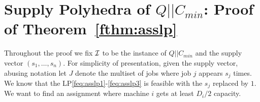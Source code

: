 \section{Supply Polyhedra of $Q||C_{min}$: Proof of Theorem~\ref{fthm:asslp}}\label{fsec:asslp}
\def\pv{\mathbf{b}}
\newcommand{\dem}{\mathsf{cap}}
  Throughout the proof we fix ${\cal I}$ to be the instance of $Q||C_{min}$ %
  and the supply vector $(s_1,\ldots,s_n)$. For simplicity of presentation, given the supply vector, abusing notation let $J$ denote the multiset of jobs where job $j$ appears $s_j$ times. We know that the LP\eqref{feq:asslp1}-\eqref{feq:asslp3} is feasible with the $s_j$ replaced by $1$. %
  We want to find an assignment where machine $i$ gets at least $D_i/2$ capacity.
%
